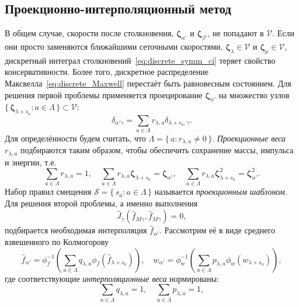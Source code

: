 \documentclass[a4paper,12pt]{article}
\newcommand{\bzeta}{\boldsymbol{\zeta}}
\newcommand{\Set}[2]{\{\,{#1}:{#2}\,\}}
\begin{document}
\subsection{Проекционно-интерполяционный метод}

В общем случае, скорости после столкновения,
\(\bzeta_{\alpha'}\) и \(\bzeta_{\beta'}\), не попадают в \(\mathcal{V}\).
Если они просто заменяются ближайшими сеточными скоростями,
\(\bzeta_{\lambda}\in\mathcal{V}\) и \(\bzeta_{\mu}\in\mathcal{V}\),
дискретный интеграл столкновений~\eqref{eq:discrete_symm_ci} теряет свойство консервативности.
Более того, дискретное распределение Максвелла~\eqref{eq:discrete_Maxwell} перестаёт быть равновесным состоянием.
Для решения первой проблемы применяется проецирование \(\bzeta_{\alpha'}\)
на множество узлов \(\Set{\bzeta_{\lambda+s_a}}{a\in\Lambda}\subset\mathcal{V}\):
\begin{equation}\label{eq:ci_projection}
    \delta_{\alpha'\gamma} = \sum_{a\in\Lambda} r_{\lambda,a}\delta_{\lambda+s_a,\gamma}.
\end{equation}
Для определённости будем считать, что \(\Lambda = \Set{a}{r_{\lambda,a}\neq0}\).
\emph{Проекционные веса} \(r_{\lambda,a}\) подбираются таким образом, чтобы обеспечить сохранение массы, импульса и энергии, т.е.
\begin{equation}\label{eq:stencil_conservation}
    \sum_{a\in\Lambda} r_{\lambda,a} = 1, \quad
    \sum_{a\in\Lambda} r_{\lambda,a} \bzeta_{\lambda+s_a} = \bzeta_{\alpha'}, \quad
    \sum_{a\in\Lambda} r_{\lambda,a} \bzeta_{\lambda+s_a}^2 = \bzeta_{\alpha'}^2.
\end{equation}
Набор правил смещения \(\mathcal{S} = \Set{s_a}{a\in\Lambda}\)
называется \emph{проекционным шаблоном}.
Для решения второй проблемы, а именно выполнения
\begin{equation}\label{eq:strict_interpolation}
    \hat{J}_\gamma(\hat{f}_{M\gamma}, \hat{f}_{M\gamma}) = 0,
\end{equation}
подбирается необходимая интерполяция \(\hat{f}_{\alpha'}\).
Рассмотрим её в виде среднего взвешенного по Колмогорову
\begin{equation}\label{eq:Kolmogorov_mean}
    \hat{f}_{\alpha'} = \phi_f^{-1}\left(\sum_{a\in\Lambda} q_{\lambda,a} \phi_f\left(\hat{f}_{\lambda+s_a}\right)\right), \quad
    w_{\alpha'} = \phi_w^{-1}\left(\sum_{a\in\Lambda} p_{\lambda,a} \phi_w\left(w_{\lambda+s_a}\right)\right),
\end{equation}
где соответствующие \emph{интерполяционные веса} нормированы:
\begin{equation}\label{eq:normalized_pq}
    \sum_{a\in\Lambda} q_{\lambda,a} = 1, \quad
    \sum_{a\in\Lambda} p_{\lambda,a} = 1,
\end{equation}
\end{document}
